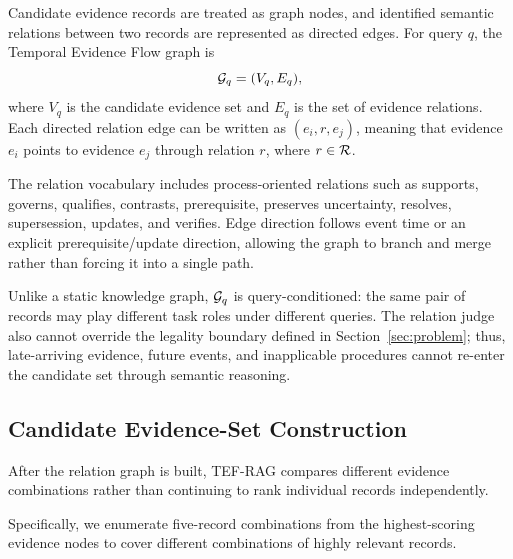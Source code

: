 Candidate evidence records are treated as graph nodes, and identified semantic relations between two records are represented as directed edges. For query $q$, the Temporal Evidence Flow graph is
\begin{equation}
\mathcal{G}_q=(V_q,E_q),
\end{equation}
where $V_q$ is the candidate evidence set and $E_q$ is the set of evidence relations. Each directed relation edge can be written as $(e_i,r,e_j)$, meaning that evidence $e_i$ points to evidence $e_j$ through relation $r$, where $r\in\mathcal{R}$.

The relation vocabulary includes process-oriented relations such as supports, governs, qualifies, contrasts, prerequisite, preserves uncertainty, resolves, supersession, updates, and verifies. Edge direction follows event time or an explicit prerequisite/update direction, allowing the graph to branch and merge rather than forcing it into a single path.

Unlike a static knowledge graph, $\mathcal{G}_q$ is query-conditioned: the same pair of records may play different task roles under different queries. The relation judge also cannot override the legality boundary defined in Section~\ref{sec:problem}; thus, late-arriving evidence, future events, and inapplicable procedures cannot re-enter the candidate set through semantic reasoning.

\subsection{Candidate Evidence-Set Construction}

After the relation graph is built, TEF-RAG compares different evidence combinations rather than continuing to rank individual records independently. 

Specifically, we enumerate five-record combinations from the highest-scoring evidence nodes to cover different combinations of highly relevant records. 

